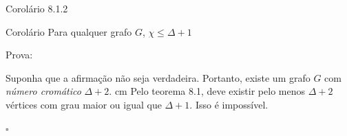 \documentclass{beamer}
\begin{document}
\begin{frame}{Corolário 8.1.2}{}
    \begin{alertblock}{Corolário}
        Para qualquer grafo $G$, $\chi \leq \Delta + 1$
    \end{alertblock}
    \vskip 1.5cm
    \begin{block}{Prova:}
        \begin{sloppypar}
            \justifying
            Suponha que a afirmação não seja verdadeira. Portanto, existe um grafo $G$ com \textit{número cromático} $\Delta + 2$.
             cm
            Pelo teorema 8.1, deve existir pelo menos $\Delta+2$ vértices com grau maior ou igual que $\Delta +1$. Isso é impossível.            
            
            \hfill\(\square\)
        \end{sloppypar}
    \end{block}
\end{frame}
\end{document}
